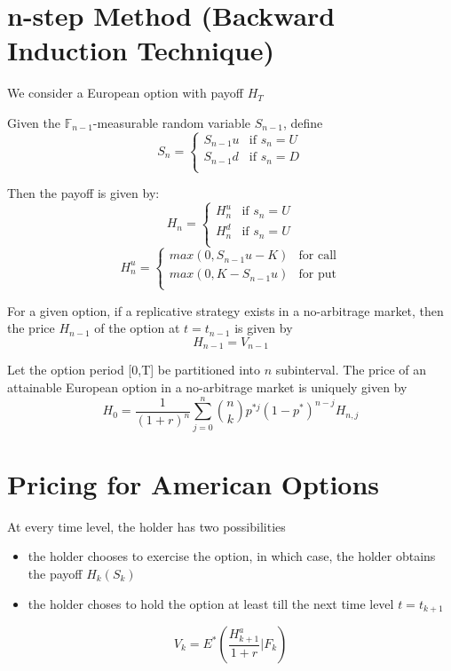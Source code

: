 \documentclass{report}
\begin{document}
\section{n-step Method (Backward Induction Technique)}
We consider a European option with payoff $H_T$


Given the $\mathbb{F}_{n-1}$-measurable random variable $S_{n-1}$, define
\[
S_n = 
\begin{cases}
    S_{n-1}u & \text{if } s_n = U \\
    S_{n-1}d & \text{if } s_n = D \\
\end{cases}
\]

Then the payoff is given by:
\[
H_n = \begin{cases}
    H_n^u & \text{if } s_n = U \\
    H_n^d & \text{if } s_n = U \\
\end{cases}\]
\[
H_n^u = \begin{cases}
    max(0, S_{n-1}u-K) & \text{for call}\\
    max(0, K-S_{n-1}u) & \text{for put} \\ 
\end{cases}\]

For a given option, if a replicative strategy exists in a no-arbitrage market, then the price $H_{n-1}$ of the option at $t = t_{n-1}$ is given by
\[H_{n-1} = V_{n-1}\]


Let the option period [0,T] be partitioned into $n$ subinterval. The price of an attainable European option in a no-arbitrage market is uniquely given by
\[H_0 = \frac{1}{(1+r)^n} \sum_{j=0}^n \binom{n}{k}p^{*j}(1-p^*)^{n-j}H_{n,j}\]



\section{Pricing for American Options}
At every time level, the holder has two possibilities
\begin{itemize}
    \item the holder chooses to exercise the option, in which case, the holder obtains the payoff $H_k(S_k)$
    \item the holder choses to hold the option at least till the next time level $t=t_{k+1}$
\end{itemize}


\[V_k = E^*(\frac{H_{k+1}^a}{1+r}\vert F_k)\]
\end{document}
